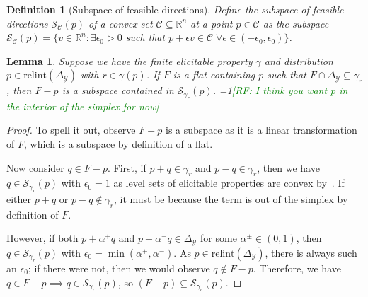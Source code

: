 \documentclass{article}
\newcommand{\Comments}{1}
\newcommand{\mynote}[2]{\ifnum\Comments=1\textcolor{#1}{#2}\fi}
\newcommand{\raf}[1]{\mynote{green}{[RF: #1]}}
\newcommand{\reals}{\mathbb{R}}
\newcommand{\simplex}{\Delta_\Y}
\newcommand{\relint}[1]{\mathrm{relint}(#1)}
\newcommand{\C}{\mathcal{C}}
\newcommand{\R}{\mathcal{R}}
\renewcommand{\S}{\mathcal{S}}
\newcommand{\Y}{\mathcal{Y}}
\newtheorem{lemma}{Lemma}
\newtheorem{definition}{Definition}
\begin{document}

\begin{definition}[Subspace of feasible directions]
	Define the \emph{subspace of feasible directions} $\S_\C(p)$ of a convex set $\C \subseteq \reals^n$ at a point $p \in \C$ as the subspace $\S_\C(p) = \{ v \in \reals^n : \exists \epsilon_0 > 0 $ such that $p + \epsilon v \in \C \; \forall \epsilon \in (-\epsilon_0,\epsilon_0) \}$.
\end{definition}

\begin{lemma}\label{lem:feas-sub-is-a-flat}
	Suppose we have the finite elicitable property $\gamma$ and distribution $p \in \relint{\simplex}$ with $r \in \gamma(p)$.
	If $F$ is a flat containing $p$ such that $F \cap \simplex \subseteq \gamma_r$, then $F - p$ is a subspace contained in $\S_{\gamma_r}(p)$.
  \raf{I think you want $p$ in the interior of the simplex for now}
\end{lemma}
\begin{proof}
  To spell it out, observe $F-p$ is a subspace as it is a linear transformation of $F$, which is a subspace by definition of a flat.
  
  Now consider $q \in F - p$.
  First, if $p+q \in \gamma_r$ and $p -q \in \gamma_r$, then we have $q \in \S_{\gamma_r}(p)$ with $\epsilon_0 = 1$ as level sets of elicitable properties are convex by~\cite{lambert2009eliciting}.
  If either $p + q$ or $p - q \not \in \gamma_r$, it must be because the term is out of the simplex by definition of $F$.
  
  However, if both $p + \alpha^+ q$ and $p - \alpha^- q \in \simplex$ for some $\alpha^\pm \in (0,1)$, then $q \in \S_{\gamma_r}(p)$ with $\epsilon_0 = \min(\alpha^+, \alpha^-)$.
  As $p \in \relint{\simplex}$, there is always such an $\epsilon_0$; if there were not, then we would observe $q \not \in F - p$.
  Therefore, we have $q \in F - p \implies q \in \S_{\gamma_r}(p)$, so $(F - p) \subseteq \S_{\gamma_r}(p)$.
\end{proof}
\end{document}
